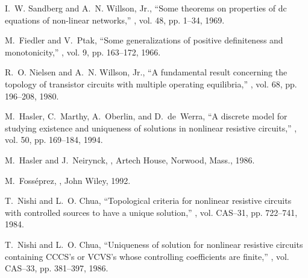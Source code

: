 \documentclass{article}
\begin{document}
%
%



\begin{thebibliography}{10}
\setlength{\itemsep}{-2pt}

I.~W. Sandberg and A.~N. {Willson, Jr.},
\newblock ``Some theorems on properties of dc equations of non-linear
  networks,''
, vol. 48, pp. 1--34, 1969.

M.~Fiedler and V.~Ptak,
\newblock ``Some generalizations of positive definiteness and monotonicity,''
, vol. 9, pp. 163--172, 1966.

R.~O. Nielsen and A.~N. {Willson, Jr.},
\newblock ``A fundamental result concerning the topology of transistor circuits
  with multiple operating equilibria,''
, vol. 68, pp. 196--208, 1980.

M.~Hasler, C.~Marthy, A.~Oberlin, and D.~de~Werra,
\newblock ``A discrete model for studying existence and uniqueness of solutions
  in nonlinear resistive circuits,''
, vol. 50, pp. 169--184, 1994.

M.~Hasler and J.~Neirynck,
,
\newblock Artech House, Norwood, Mass., 1986.

M.~Foss\'{e}prez,
,
\newblock John Wiley, 1992.

T.~Nishi and L.~O. Chua,
\newblock ``Topological criteria for nonlinear resistive circuits with
  controlled sources to have a unique solution,''
, vol. CAS--31, pp. 722--741, 1984.

T.~Nishi and L.~O. Chua,
\newblock ``Uniqueness of solution for nonlinear resistive circuits containing
  {CCCS}'s or {VCVS}'s whose controlling coefficients are finite,''
, vol. CAS--33, pp. 381--397, 1986.


\end{thebibliography}
\end{document}
